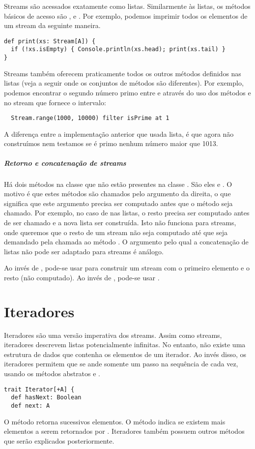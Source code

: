 Streams são acessados exatamente como listas. Similarmente às listas, os métodos básicos de acesso são
 ,  e . Por exemplo, podemos
imprimir todos os elementos de um stream da seguinte maneira.
\begin{lstlisting}
def print(xs: Stream[A]) {
  if (!xs.isEmpty) { Console.println(xs.head); print(xs.tail) }
}
\end{lstlisting}
Streams também oferecem praticamente todos os outros métodos definidos nas listas (veja a seguir onde
os conjuntos de métodos são diferentes). Por exemplo, podemos encontrar o segundo número primo entre 
 e  através do uso dos métodos 
 e  no stream que fornece o intervalo:
\begin{lstlisting}
  Stream.range(1000, 10000) filter isPrime at 1
\end{lstlisting}
A diferença entre a implementação anterior que usada lista, é que agora não
construímos nem testamos se é primo nenhum número maior que 1013.

\paragraph{Retorno e concatenação de streams} Há dois métodos na classe 
que não estão presentes na classe . São eles \code{::} e
\code{:::}.  O motivo é que estes métodos são chamados pelo argumento da direita, o
que significa que este argumento precisa ser computado antes que o método seja chamado.
Por exemplo, no caso de  nas listas, o resto  precisa ser computado
antes de \code{::} ser chamado e a nova lista ser construída.
Isto não funciona para streams, onde queremos que o resto de um stream 
não seja computado até que seja demandado pela chamada ao método .
O argumento pelo qual a concatenação de listas \code{:::} não pode ser adaptado para streams
é análogo.

Ao inv\'{e}s de , pode-se usar  para
construir um stream com o primeiro elemento  e o resto (n\~{a}o computado).
Ao invés de , pode-se usar .  


\chapter{Iteradores}

Iteradores s\~{a}o uma vers\~{a}o imperativa dos streams. Assim como streams,
iteradores descrevem listas potencialmente infinitas. No entanto, não existe uma estrutura de dados
que contenha os elementos de um iterador. Ao invés disso, os iteradores permitem que se ande somente um passo
na sequ\^{e}ncia de cada vez, usando os métodos abstratos  e .
\begin{lstlisting}
trait Iterator[+A] {
  def hasNext: Boolean
  def next: A
\end{lstlisting}
O método  retorna sucessivos elementos.  O método 
indica se existem mais elementos a serem retornados por
. Iteradores também possuem outros métodos que serão explicados posteriormente.

